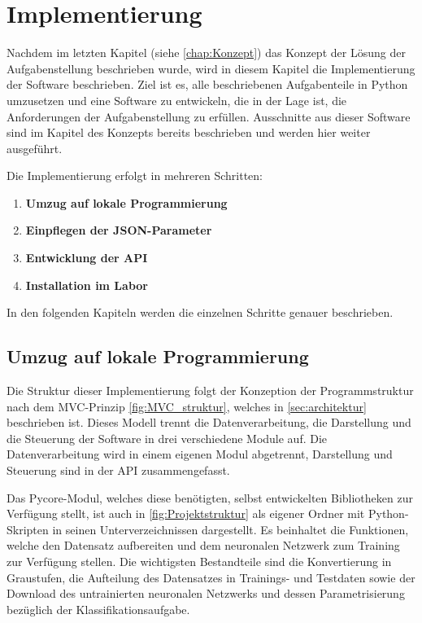 \chapter{Implementierung} \label{chap:implementierung}

Nachdem im letzten Kapitel (siehe \autoref{chap:Konzept}) das Konzept der Lösung der Aufgabenstellung beschrieben wurde, wird in diesem Kapitel die Implementierung der Software beschrieben.
Ziel ist es, alle beschriebenen Aufgabenteile in Python umzusetzen und eine Software zu entwickeln, die in der Lage ist, die Anforderungen der Aufgabenstellung zu erfüllen. Ausschnitte aus dieser Software sind im Kapitel des Konzepts bereits beschrieben und werden hier weiter ausgeführt.

Die Implementierung erfolgt in mehreren Schritten:

\begin{enumerate}
    \item \textbf{Umzug auf lokale Programmierung} 
    \item \textbf{Einpflegen der JSON-Parameter} 
    \item \textbf{Entwicklung der API} 
    \item \textbf{Installation im Labor}

\end{enumerate}

In den folgenden Kapiteln werden die einzelnen Schritte genauer beschrieben.

\section{Umzug auf lokale Programmierung} \label{subsec:umzug_auf_lokale_programmierung}

Die Struktur dieser Implementierung folgt der Konzeption der Programmstruktur nach dem MVC-Prinzip \autoref{fig:MVC_struktur}, welches in \autoref{sec:architektur} beschrieben ist.
Dieses Modell trennt die Datenverarbeitung, die Darstellung und die Steuerung der Software in drei verschiedene Module auf.
Die Datenverarbeitung wird in einem eigenen Modul abgetrennt, Darstellung und Steuerung sind in der API zusammengefasst.

Das Pycore-Modul, welches diese benötigten, selbst entwickelten Bibliotheken zur Verfügung stellt, ist auch in \autoref{fig:Projektstruktur} als eigener Ordner mit Python-Skripten in seinen Unterverzeichnissen dargestellt. Es beinhaltet die Funktionen, welche den Datensatz aufbereiten und dem neuronalen Netzwerk zum Training zur Verfügung stellen.
Die wichtigsten Bestandteile sind die Konvertierung in Graustufen, die Aufteilung des Datensatzes in Trainings- und Testdaten sowie der Download des untrainierten neuronalen Netzwerks und dessen Parametrisierung bezüglich der Klassifikationsaufgabe.

